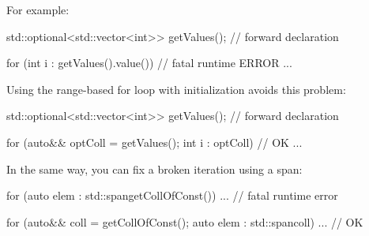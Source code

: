For example:

\begin{cpp}
std::optional<std::vector<int>> getValues(); // forward declaration

for (int i : getValues().value()) { // fatal runtime ERROR
	...
}
\end{cpp}

Using the range-based for loop with initialization avoids this problem:

\begin{cpp}
std::optional<std::vector<int>> getValues(); // forward declaration

for (auto&& optColl = getValues(); int i : optColl) { // OK
	...
}
\end{cpp}

In the same way, you can fix a broken iteration using a span:

\begin{cpp}
for (auto elem : std::span{getCollOfConst()}) ... // fatal runtime error

for (auto&& coll = getCollOfConst(); auto elem : std::span{coll}) ... // OK
\end{cpp}
























